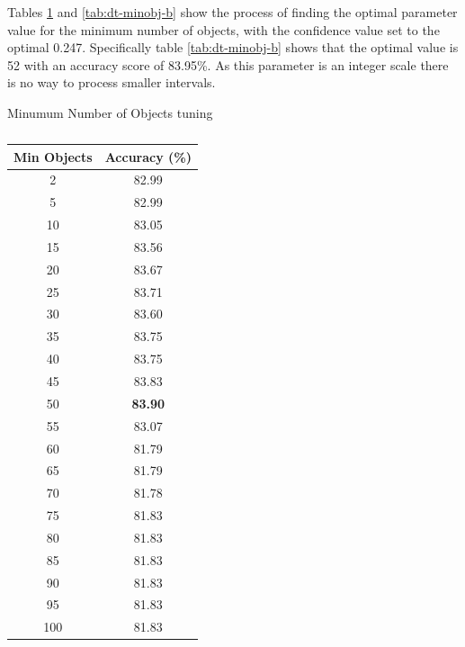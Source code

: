 \documentclass[12pt]{article}
\begin{document}
      Tables \ref{tab:dt-minobj-a} and \ref{tab:dt-minobj-b} show the process of finding the optimal parameter value for the minimum number of objects, with the confidence value set to the optimal 0.247. Specifically table \ref{tab:dt-minobj-b} shows that the optimal value is 52 with an accuracy score of 83.95\%. As this parameter is an integer scale there is no way to process smaller intervals.

      \begin{table}[H]
        \caption{Minumum Number of Objects tuning}
        \begin{subtable}{.5\linewidth}
          \centering
          \caption{}
          \begin{tabular}{c|c}
          \toprule
          \multicolumn{1}{l|}{Min Objects} & \multicolumn{1}{l}{Accuracy (\%)} \\
          \midrule
          2     & 82.99 \\
          5     & 82.99 \\
          10    & 83.05 \\
          15    & 83.56 \\
          20    & 83.67 \\
          25    & 83.71 \\
          30    & 83.60 \\
          35    & 83.75 \\
          40    & 83.75 \\
          45    & 83.83 \\
          50    & \textbf{83.90} \\
          55    & 83.07 \\
          60    & 81.79 \\
          65    & 81.79 \\
          70    & 81.78 \\
          75    & 81.83 \\
          80    & 81.83 \\
          85    & 81.83 \\
          90    & 81.83 \\
          95    & 81.83 \\
          100   & 81.83 \\
          \bottomrule
          \end{tabular}
          \label{tab:dt-minobj-a}
        \end{subtable}
        \begin{subtable}{.5\linewidth}
          \centering

\end{subtable}
\end{table}
\end{document}

